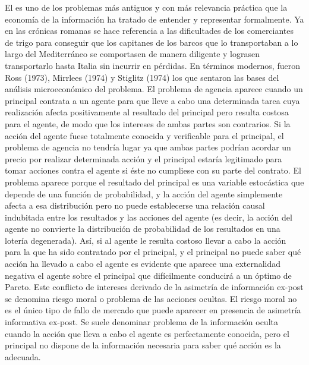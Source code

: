 \documentclass{nuevotema}
\begin{document}
El  es uno de los problemas más antiguos y con más relevancia práctica que la economía de la información ha tratado de entender y representar formalmente. Ya en las crónicas romanas se hace referencia a las dificultades de los comerciantes de trigo para conseguir que los capitanes de los barcos que lo transportaban a lo largo del Mediterráneo se comportasen de manera diligente y lograsen transportarlo hasta Italia sin incurrir en pérdidas. En términos modernos, fueron Ross (1973), Mirrlees (1974) y Stiglitz (1974) los que sentaron las bases del análisis microeconómico del problema. El problema de agencia aparece cuando un principal contrata a un agente para que lleve a cabo una determinada tarea cuya realización afecta positivamente al resultado del principal pero resulta costosa para el agente, de modo que los intereses de ambas partes son contrarios. Si la acción del agente fuese totalmente conocida y verificable para el principal, el problema de agencia no tendría lugar ya que ambas partes podrían acordar un precio por realizar determinada acción y el principal estaría legitimado para tomar acciones contra el agente si éste no cumpliese con su parte del contrato. El problema aparece porque el resultado del principal es una variable estocástica que depende de una función de probabilidad, y la acción del agente simplemente afecta a esa distribución pero no puede establecerse una relación causal indubitada entre los resultados y las acciones del agente (es decir, la acción del agente no convierte la distribución de probabilidad de los resultados en una lotería degenerada). Así, si al agente le resulta costoso llevar a cabo la acción para la que ha sido contratado por el principal, y el principal no puede saber qué acción ha llevado a cabo el agente es evidente que aparece una externalidad negativa el agente sobre el principal que difícilmente conducirá a un óptimo de Pareto. Este conflicto de intereses derivado de la asimetría de información ex-post se denomina riesgo moral o problema de las acciones ocultas. El riesgo moral no es el único tipo de fallo de mercado que puede aparecer en presencia de asimetría informativa ex-post. Se suele denominar problema de la información oculta cuando la acción que lleva a cabo el agente es perfectamente conocida, pero el principal no dispone de la información necesaria para saber qué acción es la adecuada. 
\end{document}
